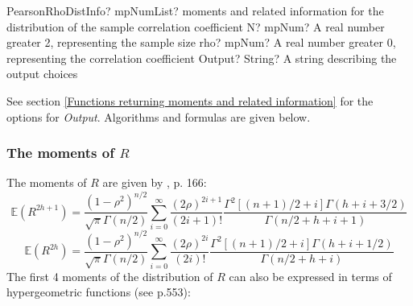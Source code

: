\begin{mpFunctionsExtract}
	\mpFunctionThreeNotImplemented
	{PearsonRhoDistInfo? mpNumList? moments and related information for the distribution of the sample correlation coefficient}
	{N? mpNum? A real number greater 2, representing the sample size}
	{rho? mpNum? A real number greater 0, representing the correlation coefficient}
	{Output? String? A string describing the output choices}
\end{mpFunctionsExtract}

\vspace{0.3cm}

See section \ref{Functions returning moments and related information} for the options for {\itshape\sffamily Output}. Algorithms and formulas are given below.



\subsubsection{The moments of $R$}
The moments of $R$ are given by \cite{Anderson_book_2003}, p. 166:
\begin{equation}
	\mathbb{E}\left(R^{2h+1}\right) = \frac{(1-\rho^2)^{n/2}}{\sqrt{\pi} \Gamma(n/2)} \sum_{i=0}^{\infty} {\frac{(2\rho)^{2i+1}}{(2i+1)!} \frac{\Gamma^2[(n+1)/2+i] \Gamma(h+i+3/2)}{\Gamma(n/2 +h+i+1)}   }
\end{equation}
\begin{equation}
	\mathbb{E}\left(R^{2h}\right) = \frac{(1-\rho^2)^{n/2}}{\sqrt{\pi} \Gamma(n/2)} \sum_{i=0}^{\infty} {\frac{(2\rho)^{2i}}{(2i)!} \frac{\Gamma^2[(n+1)/2+i] \Gamma(h+i+1/2)}{\Gamma(n/2 +h+i)}   }
\end{equation}
The first 4 moments of the distribution of $R$ can also be expressed in terms of hypergeometric functions (see \cite{Johnson_1995} p.553):

